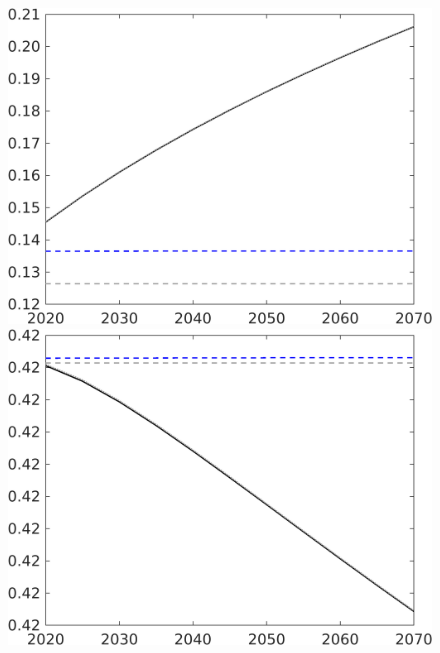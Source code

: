 \begin{figure}[h!!]
\begin{minipage}[]{0.32\textwidth}
	\end{minipage}
	\begin{minipage}[]{0.32\textwidth}
		\includegraphics[width=1\textwidth]{../../codding_model/own_basedOnFried/optimalPol_190722_tidiedUp/figures/all_10Aout22/CountXgrTaulLF_target_GFF_spillover0_sep1_extern0_PV1_etaa0.79_lgd0.png}
	\end{minipage}
	\begin{minipage}[]{0.32\textwidth}
		\includegraphics[width=1\textwidth]{../../codding_model/own_basedOnFried/optimalPol_190722_tidiedUp/figures/all_10Aout22/CountXgrTaulLF_target_EY_spillover0_sep1_extern0_PV1_etaa0.79_lgd0.png}

\end{minipage}
\end{figure}
